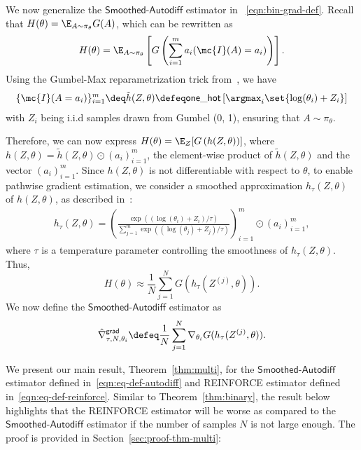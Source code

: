 
\noindent We now generalize the $\mathsf{Smoothed\text{-}Autodiff}$ estimator in ~\eqref{eqn:bin-grad-def}. Recall that $H(\theta) = \E_{A\sim \pi_\theta} {G}(A)$,  which can be rewritten as $$H(\theta) =  \E_{A\sim \pi_\theta}\left[ G \left(\sum_{i=1}^ma_i (\mc{I}(A)=a_i) \right) \right].$$
 Using the Gumbel-Max reparametrization trick  
 from~\citep{JangGuPo17}, we have
\begin{align*}
\{\mc{I}(A=a_i)\}_{i=1}^m 
\deq 
\tilde{h}(Z,\theta) \defeq
\mathsf{one\_hot}\left[ \argmax_i\set{\log(\theta_i) + Z_i} \right]
\end{align*}
 with  $Z_i$ being i.i.d samples drawn from Gumbel (0, 1), ensuring that 
  $A \sim \pi_\theta$. 
  
  
 \noindent Therefore, we can now express   $H(\theta) = \E_Z[G\left(h(Z,\theta) \right)]$, where $h(Z,\theta) = \tilde{h}(Z,\theta) \odot (a_i)_{i=1}^m $, the element-wise product  of $\tilde{h}(Z,\theta)$ and  the vector $(a_i)_{i=1}^m$. 
Since $h(Z,\theta)$ is not differentiable with respect to $\theta$, to enable pathwise gradient estimation, we consider a smoothed approximation $h_\tau(Z,\theta)$ of $ h(Z,\theta)$, as described in~\citep{JangGuPo17}:
\begin{align*}
h_\tau(Z,\theta)  
=
\left( \frac{\exp((\log (\theta_i)+Z_i)/\tau)}{\sum_{j=1}^{m}\exp((\log (\theta_j)+Z_j)/\tau)}\right)_{i=1}^m \odot (a_i)_{i=1}^m,
\end{align*} 
where $\tau$ is a temperature parameter controlling the smoothness of $h_\tau(Z,\theta)$. Thus, $$H(\theta)  \approx 
\frac{1}{N}\sum_{j=1}^N G(h_\tau(Z^{(j)},\theta)).$$
We now define the $\mathsf{Smoothed\text{-}Autodiff}$ estimator as
\begin{align}
  \hat{\nabla}^{\mathsf{grad}}_{\tau, N,\theta_i}
  \defeq \frac{1}{N}\sum_{j=1}^N\nabla_{\theta_i}G(h_\tau(Z^{(j)},\theta)).
\label{eqn:eq-def-autodiff}
\end{align}

We present our main result, Theorem~\ref{thm:multi}, for the $\mathsf{Smoothed\text{-}Autodiff}$ estimator defined in~\eqref{eqn:eq-def-autodiff} and \textsf{REINFORCE} estimator defined in~\eqref{eqn:eq-def-reinforce}.  Similar to Theorem~\ref{thm:binary},
the result below highlights 
that the \textsf{REINFORCE}  estimator will be worse
as compared to the $\mathsf{Smoothed\text{-}Autodiff}$ estimator
if the number of samples $N$ is not   large enough.
The proof is provided in Section~\ref{sec:proof-thm-multi}:



